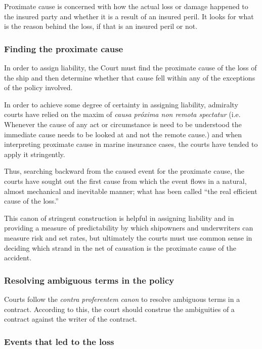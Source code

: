 Proximate cause is concerned with how the actual loss or damage happened to the insured party and whether it is a result of an insured peril. It looks for what is the reason behind the loss, if that is an insured peril or not.

\subsubsection{Finding the proximate cause}

In order to assign liability, the Court must find the proximate cause of the loss of the ship and then determine whether that cause fell within any of the exceptions of the policy involved.

In order to achieve some degree of certainty in assigning liability,
admiralty courts have relied on the maxim of \textit{causa próxima non remota spectatur}  \cite{marineInsuranceAct55} (i.e. Whenever the cause of any act or circumstance is need to be understood the immediate cause needs to be looked at and not the remote cause.)
and when interpreting  proximate cause in marine insurance cases, the courts have
tended to apply it stringently.

Thus, searching backward from the caused event for the proximate cause, the courts have sought out the first cause from which the event flows in a natural, almost mechanical and inevitable manner; what has been called “the real efficient cause of the loss.”

This canon of stringent construction is helpful in assigning liability and in providing a measure of predictability by which shipowners and underwriters can measure risk and set rates, but ultimately the courts must use common sense in deciding which strand in the net of causation is the proximate cause of the accident.

\subsubsection{Resolving ambiguous terms in the policy}

Courts follow the \textit{contra proferentem canon} to resolve ambiguous terms in a contract. According to this, the court should construe the ambiguities of a contract against the writer of the contract. 

\subsubsection{Events that led to the loss}

